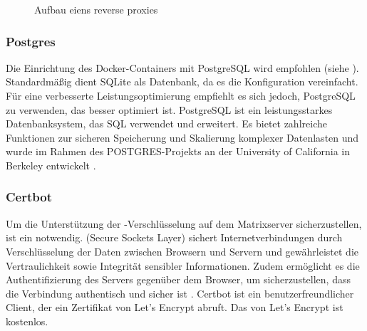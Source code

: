 \begin{figure}[H]
	\caption{Aufbau eiens reverse proxies}
\label{fig:patient_reverse_proxy}
\end{figure}

\subsubsection{Postgres}
Die Einrichtung des  Docker-Containers mit PostgreSQL wird empfohlen (siehe \cite{noauthor_installation_nodate}). Standardmäßig dient SQLite als Datenbank, da es die Konfiguration vereinfacht. Für eine verbesserte Leistungsoptimierung empfiehlt es sich jedoch, PostgreSQL zu verwenden, das besser optimiert ist. PostgreSQL ist ein leistungsstarkes Datenbanksystem, das SQL verwendet und erweitert. Es bietet zahlreiche Funktionen zur sicheren Speicherung und Skalierung komplexer Datenlasten und wurde im Rahmen des POSTGRES-Projekts an der University of California in Berkeley entwickelt \cite{noauthor_postgresql_nodate}.

\subsubsection{Certbot}
Um die Unterstützung der -Verschlüsselung auf dem Matrixserver sicherzustellen, ist ein  notwendig.  (Secure Sockets Layer) sichert Internetverbindungen durch Verschlüsselung der Daten zwischen Browsern und Servern und gewährleistet die Vertraulichkeit sowie Integrität sensibler Informationen. Zudem ermöglicht es die Authentifizierung des Servers gegenüber dem Browser, um sicherzustellen, dass die Verbindung authentisch und sicher ist \cite{SSL}. Certbot ist ein benutzerfreundlicher Client, der ein Zertifikat von Let's Encrypt abruft.  Das  von Let's Encrypt ist kostenlos. 

